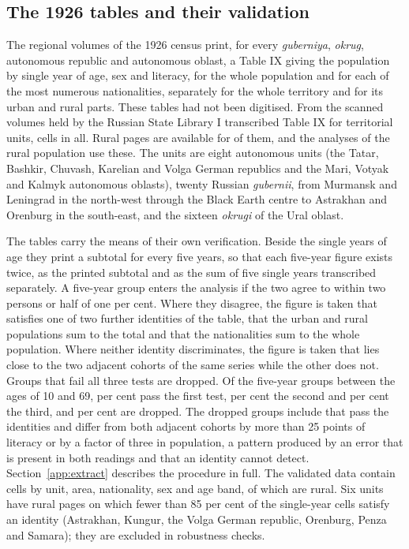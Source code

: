 \subsection{The 1926 tables and their validation}

The regional volumes of the 1926 census print, for every \emph{guberniya}, \emph{okrug}, autonomous republic and autonomous oblast, a Table IX giving the population by single year of age, sex and literacy, for the whole population and for each of the most numerous nationalities, separately for the whole territory and for its urban and rural parts. These tables had not been digitised. From the scanned volumes held by the Russian State Library I transcribed Table IX for  territorial units,  cells in all. Rural pages are available for  of them, and the analyses of the rural population use these. The units are eight autonomous units (the Tatar, Bashkir, Chuvash, Karelian and Volga German republics and the Mari, Votyak and Kalmyk autonomous oblasts), twenty Russian \emph{gubernii}, from Murmansk and Leningrad in the north-west through the Black Earth centre to Astrakhan and Orenburg in the south-east, and the sixteen \emph{okrugi} of the Ural oblast.

The tables carry the means of their own verification. Beside the single years of age they print a subtotal for every five years, so that each five-year figure exists twice, as the printed subtotal and as the sum of five single years transcribed separately. A five-year group enters the analysis if the two agree to within two persons or half of one per cent. Where they disagree, the figure is taken that satisfies one of two further identities of the table, that the urban and rural populations sum to the total and that the nationalities sum to the whole population. Where neither identity discriminates, the figure is taken that lies close to the two adjacent cohorts of the same series while the other does not. Groups that fail all three tests are dropped. Of the  five-year groups between the ages of 10 and 69,  per cent pass the first test,  per cent the second and  per cent the third, and  per cent are dropped. The dropped groups include  that pass the identities and differ from both adjacent cohorts by more than 25 points of literacy or by a factor of three in population, a pattern produced by an error that is present in both readings and that an identity cannot detect. Section~\ref{app:extract} describes the procedure in full. The validated data contain  cells by unit, area, nationality, sex and age band, of which  are rural. Six units have rural pages on which fewer than 85 per cent of the single-year cells satisfy an identity (Astrakhan, Kungur, the Volga German republic, Orenburg, Penza and Samara); they are excluded in robustness checks.

